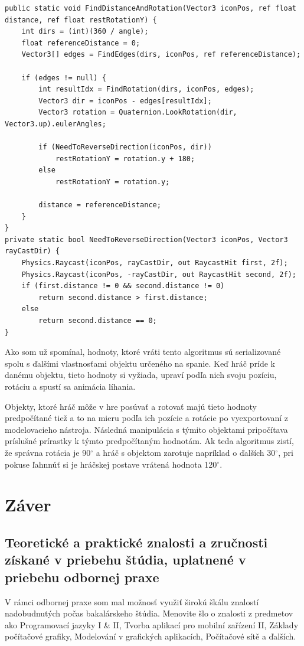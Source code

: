 \documentclass[slovak, bachelorpractice]{diploma}
\begin{document}
\vspace{15pt}
\begin{lstlisting}[label=src:entry,caption={Vstupný bod algoritmu na získanie rotácie a pozície postavy pri ležaní}]
public static void FindDistanceAndRotation(Vector3 iconPos, ref float distance, ref float restRotationY) {
    int dirs = (int)(360 / angle);
    float referenceDistance = 0;
    Vector3[] edges = FindEdges(dirs, iconPos, ref referenceDistance);

    if (edges != null) {
        int resultIdx = FindRotation(dirs, iconPos, edges);
        Vector3 dir = iconPos - edges[resultIdx];
        Vector3 rotation = Quaternion.LookRotation(dir, Vector3.up).eulerAngles;

        if (NeedToReverseDirection(iconPos, dir))
            restRotationY = rotation.y + 180;
        else 
        	restRotationY = rotation.y;

        distance = referenceDistance;
    }
}
private static bool NeedToReverseDirection(Vector3 iconPos, Vector3 rayCastDir) {
    Physics.Raycast(iconPos, rayCastDir, out RaycastHit first, 2f);
    Physics.Raycast(iconPos, -rayCastDir, out RaycastHit second, 2f);
    if (first.distance != 0 && second.distance != 0)
        return second.distance > first.distance;
    else 
    	return second.distance == 0;
}
\end{lstlisting}

Ako som už spomínal, hodnoty, ktoré vráti tento algoritmus sú serializované spolu s ďalšími vlastnosťami objektu určeného na spanie. Keď hráč príde k danému objektu, tieto hodnoty si vyžiada, upraví podľa nich svoju pozíciu, rotáciu a spustí sa animácia líhania.

Objekty, ktoré hráč môže v hre posúvať a rotovať majú tieto hodnoty predpočítané tiež a to na mieru podľa ich pozície a rotácie po vyexportovaní z modelovacieho nástroja. Následná manipulácia s týmito objektami pripočítava príslušné prírastky k týmto predpočítaným hodnotám. Ak teda algoritmus zistí, že správna rotácia je 90$^{\circ}$ a hráč s objektom zarotuje napríklad o ďalších 30$^{\circ}$, pri pokuse ľahnnúť si je hráčskej postave vrátená hodnota 120$^{\circ}$.

\chapter{Záver}
\section{Teoretické a praktické znalosti a zručnosti získané v priebehu štúdia, uplatnené v priebehu odbornej praxe}
V rámci odbornej praxe som mal možnosť využiť širokú škálu znalostí nadobudnutých počas bakalárskeho štúdia. Menovite šlo o znalosti z predmetov ako Programovací jazyky I \& II, Tvorba aplikací pro mobilní zařízení II, Základy počítačové grafiky, Modelování v grafických aplikacích, Počítačové sítě a ďalších. 
\end{document}
